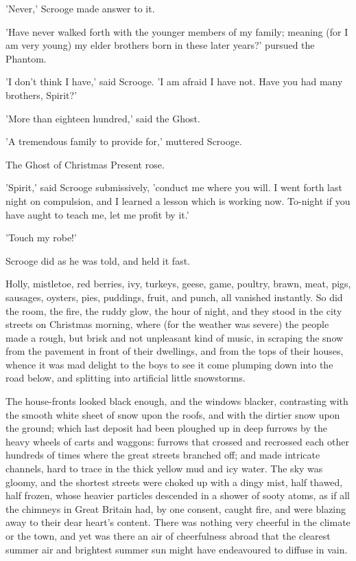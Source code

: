 'Never,' Scrooge made answer to it.

'Have never walked forth with the younger members of my family; meaning
(for I am very young) my elder brothers born in these later years?'
pursued the Phantom.

'I don't think I have,' said Scrooge. 'I am afraid I have not. Have you
had many brothers, Spirit?'

'More than eighteen hundred,' said the Ghost.

'A tremendous family to provide for,' muttered Scrooge.

The Ghost of Christmas Present rose.

'Spirit,' said Scrooge submissively, 'conduct me where you will. I went
forth last night on compulsion, and I learned a lesson which is working
now. To-night if you have aught to teach me, let me profit by it.'

'Touch my robe!'

Scrooge did as he was told, and held it fast.

Holly, mistletoe, red berries, ivy, turkeys, geese, game, poultry,
brawn, meat, pigs, sausages, oysters, pies, puddings, fruit, and punch,
all vanished instantly. So did the room, the fire, the ruddy glow, the
hour of night, and they stood in the city streets on Christmas morning,
where (for the weather was severe) the people made a rough, but brisk
and not unpleasant kind of music, in scraping the snow from the pavement
in front of their dwellings, and from the tops of their houses, whence
it was mad delight to the boys to see it come plumping down into the
road below, and splitting into artificial little snowstorms.

The house-fronts looked black enough, and the windows blacker,
contrasting with the smooth white sheet of snow upon the roofs, and with
the dirtier snow upon the ground; which last deposit had been ploughed
up in deep furrows by the heavy wheels of carts and waggons: furrows
that crossed and recrossed each other hundreds of times where the great
streets branched off; and made intricate channels, hard to trace in the
thick yellow mud and icy water. The sky was gloomy, and the shortest
streets were choked up with a dingy mist, half thawed, half frozen,
whose heavier particles descended in a shower of sooty atoms, as if all
the chimneys in Great Britain had, by one consent, caught fire, and were
blazing away to their dear heart's content. There was nothing very
cheerful in the climate or the town, and yet was there an air of
cheerfulness abroad that the clearest summer air and brightest summer
sun might have endeavoured to diffuse in vain.

